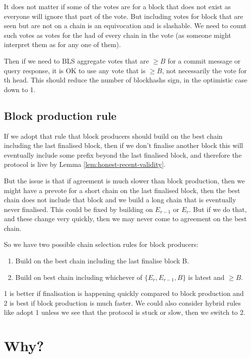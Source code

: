 \documentclass{article}
\begin{document}
It does not matter if some of the votes are for a block that does not exist as everyone will ignore that part of the vote. But including votes for block that are seen but are not on a chain is an equivocation and is slashable. We need to count such votes as votes for the had of every chain in the vote (as someone might interpret them as for any one of them).

Then if we need to BLS aggregate votes that are $\geq B$ for a commit message or query response, it is OK to use any vote that is $\geq B$, not necessarily the vote for th head. This should reduce the number of blockhashs sign, in the optimistic case down to 1.

\subsection{  Block production rule}

If we adopt that rule that block producers should build on the best chain including the last finalised block, then if we don't finalise another block this will eventually include some prefix  beyond the last finalised block, and therefore the protocol is live by Lemma \ref{lem:honest-recent-validity}.

But the issue is that if agreement is much slower than block production, then we might have a prevote for a short chain on the last finalised block, then the best chain does not include that block and we build a long chain that is eventually never finalised. This could be fixed by building on $E_{r-1}$ or $E_r$. But if we do that, and these change very quickly, then we may never come to agreement on the best chain. 

So we have two possible chain selection rules for block producers:

\begin{enumerate}
\item Build on the best chain including the last finalise block B.
\item Build on best chain including whichever of $\{E_r,E_{r-1},B\}$ is latest and $\geq B$.
\end{enumerate}

1 is better if finalisation is happening quickly compared to block production and 2 is best if block production is much faster. We could also consider hybrid rules like adopt 1 unless we see that the protocol is stuck or slow, then we switch to 2.

\section{Why?}
\end{document}
